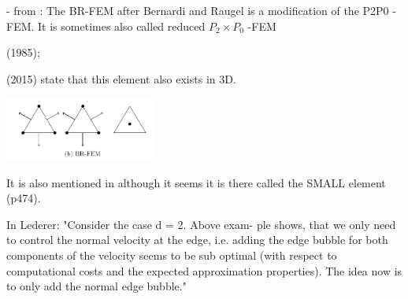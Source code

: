 
- from \textcite{cakp15}: The BR-FEM after Bernardi and Raugel \cite{bera85} is a modification of the P2P0 - FEM.
It is sometimes also called reduced $P_2\times P_0$ -FEM \cite{cakp15}

\textcite{bera85} (1985); 

\textcite{cakp15} (2015) state that this element also exists in 3D.

\includegraphics[width=5cm]{images/pair_bernardi_raugel/cakp15}

It is also mentioned in \textcite{bobf13} although it seems it is there called the SMALL element (p474).

In Lederer: "Consider the case d = 2. Above exam-
ple shows, that we only need to control the normal velocity at the edge, i.e. adding the
edge bubble for both components of the velocity seems to be sub optimal (with respect to
computational costs and the expected approximation properties). The idea now is to only
add the normal edge bubble."


